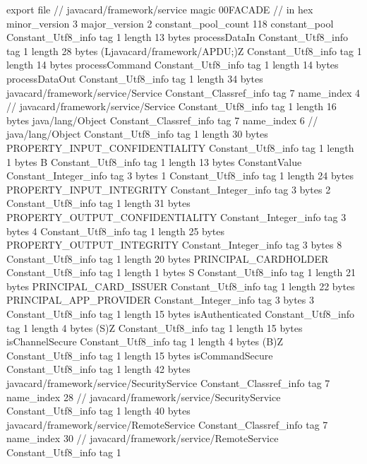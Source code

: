 export file {		// javacard/framework/service
	magic	00FACADE		 // in hex
	minor_version	3
	major_version	2
	constant_pool_count	118
	constant_pool {
		Constant_Utf8_info {
			tag	1
			length	13
			bytes	processDataIn
		}
		Constant_Utf8_info {
			tag	1
			length	28
			bytes	(Ljavacard/framework/APDU;)Z
		}
		Constant_Utf8_info {
			tag	1
			length	14
			bytes	processCommand
		}
		Constant_Utf8_info {
			tag	1
			length	14
			bytes	processDataOut
		}
		Constant_Utf8_info {
			tag	1
			length	34
			bytes	javacard/framework/service/Service
		}
		Constant_Classref_info {
			tag	7
			name_index	4		// javacard/framework/service/Service
		}
		Constant_Utf8_info {
			tag	1
			length	16
			bytes	java/lang/Object
		}
		Constant_Classref_info {
			tag	7
			name_index	6		// java/lang/Object
		}
		Constant_Utf8_info {
			tag	1
			length	30
			bytes	PROPERTY_INPUT_CONFIDENTIALITY
		}
		Constant_Utf8_info {
			tag	1
			length	1
			bytes	B
		}
		Constant_Utf8_info {
			tag	1
			length	13
			bytes	ConstantValue
		}
		Constant_Integer_info {
			tag	3
			bytes	1
		}
		Constant_Utf8_info {
			tag	1
			length	24
			bytes	PROPERTY_INPUT_INTEGRITY
		}
		Constant_Integer_info {
			tag	3
			bytes	2
		}
		Constant_Utf8_info {
			tag	1
			length	31
			bytes	PROPERTY_OUTPUT_CONFIDENTIALITY
		}
		Constant_Integer_info {
			tag	3
			bytes	4
		}
		Constant_Utf8_info {
			tag	1
			length	25
			bytes	PROPERTY_OUTPUT_INTEGRITY
		}
		Constant_Integer_info {
			tag	3
			bytes	8
		}
		Constant_Utf8_info {
			tag	1
			length	20
			bytes	PRINCIPAL_CARDHOLDER
		}
		Constant_Utf8_info {
			tag	1
			length	1
			bytes	S
		}
		Constant_Utf8_info {
			tag	1
			length	21
			bytes	PRINCIPAL_CARD_ISSUER
		}
		Constant_Utf8_info {
			tag	1
			length	22
			bytes	PRINCIPAL_APP_PROVIDER
		}
		Constant_Integer_info {
			tag	3
			bytes	3
		}
		Constant_Utf8_info {
			tag	1
			length	15
			bytes	isAuthenticated
		}
		Constant_Utf8_info {
			tag	1
			length	4
			bytes	(S)Z
		}
		Constant_Utf8_info {
			tag	1
			length	15
			bytes	isChannelSecure
		}
		Constant_Utf8_info {
			tag	1
			length	4
			bytes	(B)Z
		}
		Constant_Utf8_info {
			tag	1
			length	15
			bytes	isCommandSecure
		}
		Constant_Utf8_info {
			tag	1
			length	42
			bytes	javacard/framework/service/SecurityService
		}
		Constant_Classref_info {
			tag	7
			name_index	28		// javacard/framework/service/SecurityService
		}
		Constant_Utf8_info {
			tag	1
			length	40
			bytes	javacard/framework/service/RemoteService
		}
		Constant_Classref_info {
			tag	7
			name_index	30		// javacard/framework/service/RemoteService
		}
		Constant_Utf8_info {
			tag	1
}}}
